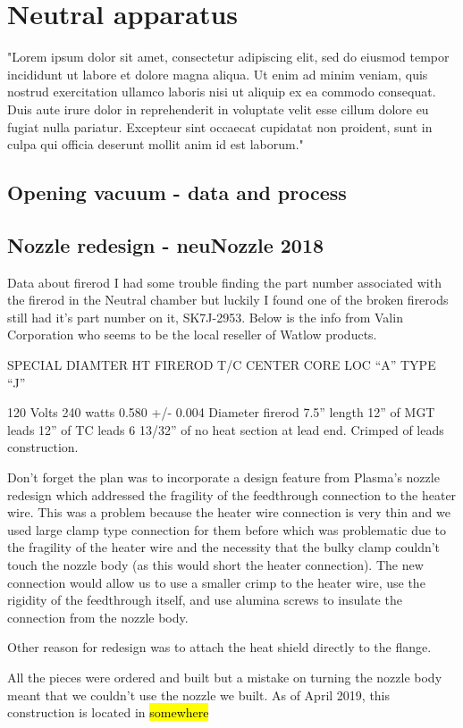 \chapter{Neutral apparatus }
"Lorem ipsum dolor sit amet, consectetur adipiscing elit, sed do eiusmod tempor incididunt ut labore et dolore magna aliqua. Ut enim ad minim veniam, quis nostrud exercitation ullamco laboris nisi ut aliquip ex ea commodo consequat. Duis aute irure dolor in reprehenderit in voluptate velit esse cillum dolore eu fugiat nulla pariatur. Excepteur sint occaecat cupidatat non proident, sunt in culpa qui officia deserunt mollit anim id est laborum."

\section{Opening vacuum - data and process}

\section{Nozzle redesign - neuNozzle 2018}


Data about firerod
I had some trouble finding the part number associated with the firerod in the Neutral chamber but luckily I found one of the broken firerods still had it's part number on it, SK7J-2953. 
Below is the info from Valin Corporation who seems to be the local reseller of Watlow products.

SPECIAL DIAMTER
HT FIREROD   
T/C CENTER CORE LOC “A” TYPE “J”
 
120 Volts
240 watts
0.580 +/- 0.004 Diameter firerod
7.5” length
12” of MGT leads
12” of TC leads
6 13/32” of no heat section at lead end.
Crimped of leads construction.

Don't forget the plan was to incorporate a design feature from Plasma's nozzle redesign which addressed the fragility of the feedthrough connection to the heater wire. This was a problem because the heater wire connection is very thin and we used large clamp type connection for them before which was problematic due to the fragility of the heater wire and the necessity that the bulky clamp couldn't touch the nozzle body (as this would short the heater connection). The new connection would allow us to use a smaller crimp to the heater wire, use the rigidity of the feedthrough itself, and use alumina screws to insulate the connection from the nozzle body.

Other reason for redesign was to attach the heat shield directly to the flange.

All the pieces were ordered and built but a mistake on turning the nozzle body meant that we couldn't use the nozzle we built. As of April 2019, this construction is located in \hl{somewhere}